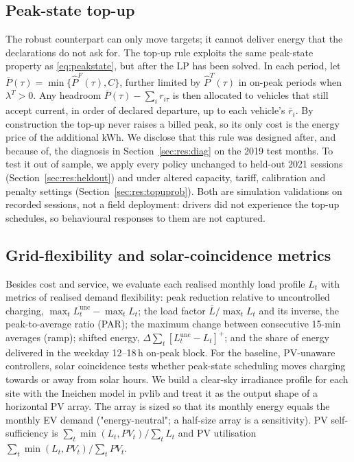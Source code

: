 \subsection{Peak-state top-up}\label{sec:topup}
The robust counterpart can only move targets; it cannot deliver energy that the declarations do not ask for. The top-up rule exploits the same peak-state property as \eqref{eq:peakstate}, but after the LP has been solved. In each period, let $\bar P(\tau)=\min\{\hat P^F(\tau),C\}$, further limited by $\hat P^T(\tau)$ in on-peak periods when $\lambda^T>0$. Any headroom $\bar P(\tau)-\sum_i r_{i\tau}$ is then allocated to vehicles that still accept current, in order of declared departure, up to each vehicle's $\bar r_i$. By construction the top-up never raises a billed peak, so its only cost is the energy price of the additional kWh. We disclose that this rule was designed after, and because of, the diagnosis in Section~\ref{sec:res:diag} on the 2019 test months. To test it out of sample, we apply every policy unchanged to held-out 2021 sessions (Section~\ref{sec:res:heldout}) and under altered capacity, tariff, calibration and penalty settings (Section~\ref{sec:res:topuprob}). Both are simulation validations on recorded sessions, not a field deployment: drivers did not experience the top-up schedules, so behavioural responses to them are not captured.

\subsection{Grid-flexibility and solar-coincidence metrics}\label{sec:metrics}
Besides cost and service, we evaluate each realised monthly load profile $L_t$ with metrics of realised demand flexibility: peak reduction relative to uncontrolled charging, $\max_t L^{\text{unc}}_t-\max_t L_t$; the load factor $\bar L/\max_t L_t$ and its inverse, the peak-to-average ratio (PAR); the maximum change between consecutive 15-min averages (ramp); shifted energy, $\Delta\sum_t[L^{\text{unc}}_t-L_t]^+$; and the share of energy delivered in the weekday 12--18\,h on-peak block.
For the baseline, PV-unaware controllers, solar coincidence tests whether peak-state scheduling moves charging towards or away from solar hours. We build a clear-sky irradiance profile for each site with the Ineichen model in pvlib \cite{Holmgren2018pvlib,Anderson2023pvlib} and treat it as the output shape of a horizontal PV array. The array is sized so that its monthly energy equals the monthly EV demand ("energy-neutral"; a half-size array is a sensitivity). PV self-sufficiency is $\sum_t\min(L_t,PV_t)/\sum_t L_t$ and PV utilisation $\sum_t\min(L_t,PV_t)/\sum_t PV_t$.


